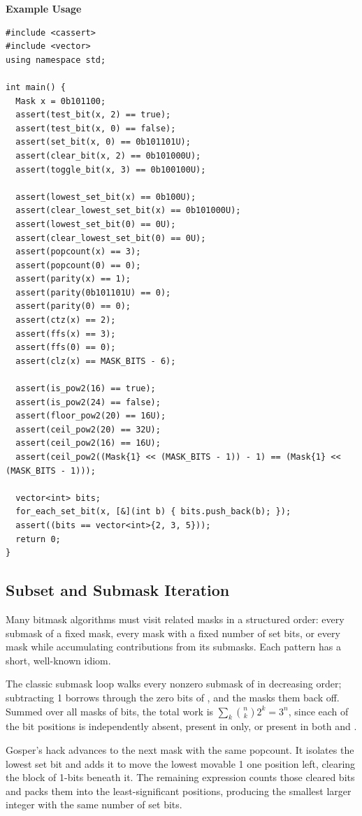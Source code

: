 \textbf{Example Usage}\par
\begin{lstlisting}[style=cpp]
#include <cassert>
#include <vector>
using namespace std;

int main() {
  Mask x = 0b101100;
  assert(test_bit(x, 2) == true);
  assert(test_bit(x, 0) == false);
  assert(set_bit(x, 0) == 0b101101U);
  assert(clear_bit(x, 2) == 0b101000U);
  assert(toggle_bit(x, 3) == 0b100100U);

  assert(lowest_set_bit(x) == 0b100U);
  assert(clear_lowest_set_bit(x) == 0b101000U);
  assert(lowest_set_bit(0) == 0U);
  assert(clear_lowest_set_bit(0) == 0U);
  assert(popcount(x) == 3);
  assert(popcount(0) == 0);
  assert(parity(x) == 1);
  assert(parity(0b101101U) == 0);
  assert(parity(0) == 0);
  assert(ctz(x) == 2);
  assert(ffs(x) == 3);
  assert(ffs(0) == 0);
  assert(clz(x) == MASK_BITS - 6);

  assert(is_pow2(16) == true);
  assert(is_pow2(24) == false);
  assert(floor_pow2(20) == 16U);
  assert(ceil_pow2(20) == 32U);
  assert(ceil_pow2(16) == 16U);
  assert(ceil_pow2((Mask{1} << (MASK_BITS - 1)) - 1) == (Mask{1} << (MASK_BITS - 1)));

  vector<int> bits;
  for_each_set_bit(x, [&](int b) { bits.push_back(b); });
  assert((bits == vector<int>{2, 3, 5}));
  return 0;
}
\end{lstlisting}
\subsection{Subset and Submask Iteration}
\label{sec:1.7.2}
Many bitmask algorithms must visit related masks in a structured order: every submask of a fixed mask, every mask with a fixed number of set bits, or every mask while accumulating contributions from its submasks. Each pattern has a short, well-known idiom.

The classic submask loop  walks every nonzero submask of  in decreasing order; subtracting 1 borrows through the zero bits of , and the  masks them back off. Summed over all masks  of  bits, the total work is $\sum_k \binom{n}{k} 2^k = 3^n$, since each of the  bit positions is independently absent, present in  only, or present in both  and .

Gosper's hack advances to the next mask with the same popcount. It isolates the lowest set bit and adds it to move the lowest movable 1 one position left, clearing the block of 1-bits beneath it. The remaining expression counts those cleared bits and packs them into the least-significant positions, producing the smallest larger integer with the same number of set bits.

